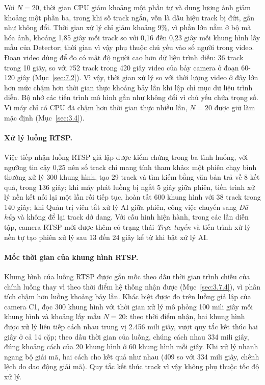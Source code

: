 Với $N = 20$, thời gian CPU giảm khoảng một phần tư và dung lượng ảnh giảm khoảng một phần ba, trong khi số track ngắn, vốn là dấu hiệu track bị đứt, gần như không đổi. Thời gian xử lý chỉ giảm khoảng 9\%, vì phần lớn nằm ở bộ mã hóa ảnh, khoảng 1,85 giây mỗi track so với 0,16 đến 0,23 giây mỗi khung hình lấy mẫu của Detector; thời gian vì vậy phụ thuộc chủ yếu vào số người trong video. Đoạn video dùng để đo có mật độ người cao hơn dữ liệu trình diễn: 36 track trong 10 giây, so với 752 track trong 420 giây video của bảy camera ở đoạn 60-120 giây (Mục~\ref{sec:7.2}). Vì vậy, thời gian xử lý so với thời lượng video ở đây lớn hơn mức chậm hơn thời gian thực khoảng bảy lần khi lập chỉ mục dữ liệu trình diễn. Bộ nhớ các tiến trình mô hình gần như không đổi vì chủ yếu chứa trọng số. Vì máy chỉ có CPU đã chậm hơn thời gian thực nhiều lần, $N = 20$ được giữ làm mặc định (Mục~\ref{sec:3.4}).

\paragraph{Xử lý luồng RTSP.} Việc tiếp nhận luồng RTSP giả lập được kiểm chứng trong ba tình huống, với ngưỡng tin cậy 0,25 nên số track chỉ mang tính tham khảo: một phiên chạy bình thường xử lý 300 khung hình, tạo 29 track và tìm kiếm bằng văn bản trả về 8 kết quả, trong 136 giây; khi máy phát luồng bị ngắt 5 giây giữa phiên, tiến trình xử lý nền kết nối lại một lần rồi tiếp tục, hoàn tất 600 khung hình với 38 track trong 140 giây; khi Quản trị viên tắt xử lý AI giữa phiên, công việc chuyển sang \emph{Đã hủy} và không để lại track dở dang. Với cấu hình hiện hành, trong các lần diễn tập, camera RTSP mới được thêm có trạng thái \emph{Trực tuyến} và tiến trình xử lý nền tự tạo phiên xử lý sau 13 đến 24 giây kể từ khi bật xử lý AI.

\paragraph{Mốc thời gian của khung hình RTSP.} Khung hình của luồng RTSP được gắn mốc theo dấu thời gian trình chiếu của chính luồng thay vì theo thời điểm hệ thống nhận được (Mục~\ref{sec:3.7.4}), vì phân tích chậm hơn luồng khoảng bảy lần. Khác biệt được đo trên luồng giả lập của camera C1, đọc 300 khung hình với thời gian xử lý mô phỏng 100 mili giây mỗi khung hình và khoảng lấy mẫu $N = 20$: theo thời điểm nhận, hai khung hình được xử lý liên tiếp cách nhau trung vị 2.456 mili giây, vượt quy tắc kết thúc hai giây ở cả 14 cặp; theo dấu thời gian của luồng, chúng cách nhau 334 mili giây, đúng khoảng cách của 20 khung hình ở 60 khung hình mỗi giây. Khi xử lý nhanh ngang bộ giải mã, hai cách cho kết quả như nhau (409 so với 334 mili giây, chênh lệch do dao động giải mã). Quy tắc kết thúc track vì vậy không phụ thuộc tốc độ xử lý.

